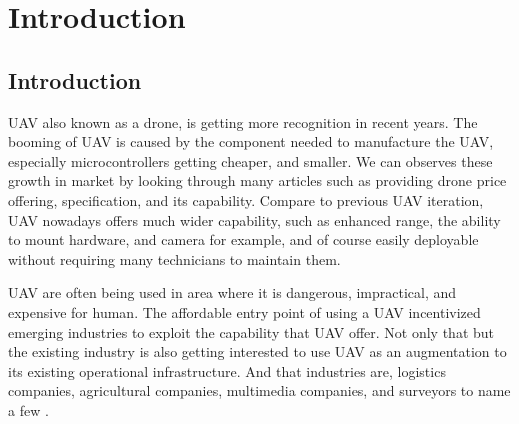 \documentclass[12pt]{report}
\begin{document}
\chapter{Introduction}
    \section{Introduction}
        \ac{UAV} also known as a drone, is getting more recognition in recent years. The booming of UAV is caused by the
	    component needed to manufacture the UAV, especially microcontrollers getting cheaper, and smaller. We can
	    observes these growth in market by looking through many articles such as \cite{austin_4_2024} providing drone
	    price offering, specification, and its capability. Compare to previous UAV iteration, UAV nowadays offers much
	    wider capability, such as enhanced range, the ability to mount hardware, and camera for example, and of course
	    easily deployable without requiring many technicians to maintain them.

		    UAV are often being used in area where it is dangerous, impractical, and expensive for human. The affordable
	    entry point of using a UAV incentivized emerging industries to exploit the capability that UAV offer. Not only
	    that but the existing industry is also getting interested to use UAV as an augmentation to its existing
	    operational infrastructure. And that industries are, logistics companies, agricultural companies, multimedia
	    companies, and surveyors to name a few \cite{dji_dji_2023}.
\end{document}

